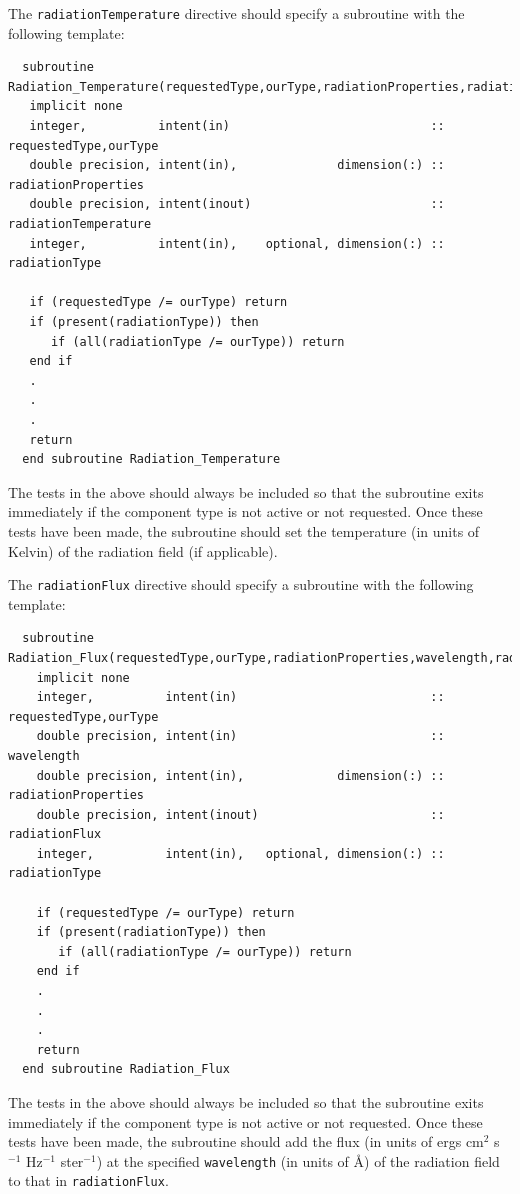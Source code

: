 The {\tt radiationTemperature} directive should specify a subroutine with the following template:
\begin{verbatim}
  subroutine Radiation_Temperature(requestedType,ourType,radiationProperties,radiationTemperature,radiationType)
   implicit none
   integer,          intent(in)                            :: requestedType,ourType
   double precision, intent(in),              dimension(:) :: radiationProperties
   double precision, intent(inout)                         :: radiationTemperature
   integer,          intent(in),    optional, dimension(:) :: radiationType

   if (requestedType /= ourType) return
   if (present(radiationType)) then
      if (all(radiationType /= ourType)) return
   end if
   .
   .
   .
   return
  end subroutine Radiation_Temperature
\end{verbatim}
The tests in the above should always be included so that the subroutine exits immediately if the component type is not active or not requested. Once these tests have been made, the subroutine should set the temperature (in units of Kelvin) of the radiation field (if applicable).

The {\tt radiationFlux} directive should specify a subroutine with the following template:
\begin{verbatim}
  subroutine Radiation_Flux(requestedType,ourType,radiationProperties,wavelength,radiationFlux,radiationType)
    implicit none
    integer,          intent(in)                           :: requestedType,ourType
    double precision, intent(in)                           :: wavelength
    double precision, intent(in),             dimension(:) :: radiationProperties
    double precision, intent(inout)                        :: radiationFlux
    integer,          intent(in),   optional, dimension(:) :: radiationType

    if (requestedType /= ourType) return
    if (present(radiationType)) then
       if (all(radiationType /= ourType)) return
    end if
    .
    .
    .
    return
  end subroutine Radiation_Flux
\end{verbatim}
The tests in the above should always be included so that the subroutine exits immediately if the component type is not active or not requested. Once these tests have been made, the subroutine should add the flux (in units of ergs cm$^2$ s$^{-1}$ Hz$^{-1}$ ster$^{-1}$) at the specified {\tt wavelength} (in units of \AA) of the radiation field to that in {\tt radiationFlux}.

